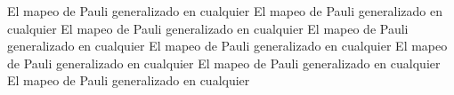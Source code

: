 \documentclass[11pt,letterpaper]{article}
\date{}
\begin{document}

El mapeo de Pauli generalizado en cualquier 
El mapeo de Pauli generalizado en cualquier 
El mapeo de Pauli generalizado en cualquier 
El mapeo de Pauli generalizado en cualquier 
El mapeo de Pauli generalizado en cualquier 
El mapeo de Pauli generalizado en cualquier 
El mapeo de Pauli generalizado en cualquier 
El mapeo de Pauli generalizado en cualquier 
\end{document}
